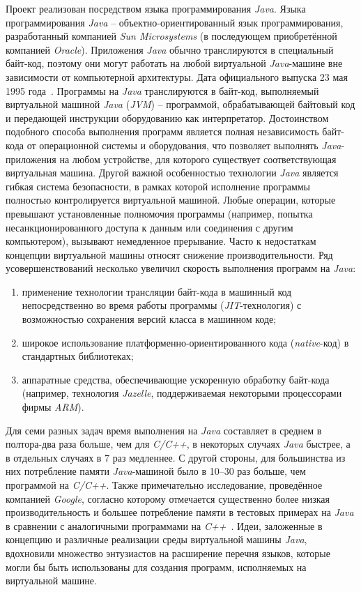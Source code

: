 Проект реализован посредством языка программирования \textit{Java}. Языка программирования \textit{Java} -- объектно-ориентированный язык программирования, разработанный компанией \textit{Sun Microsystems} (в последующем приобретённой компанией \textit{Oracle}). Приложения \textit{Java} обычно транслируются в специальный байт-код, поэтому они могут работать на любой виртуальной \textit{Java}-машине вне зависимости от компьютерной архитектуры. Дата официального выпуска 23 мая 1995 года~\cite{java}.
Программы на \textit{Java} транслируются в байт-код, выполняемый виртуальной машиной \textit{Java} (\textit{JVM}) – программой, обрабатывающей байтовый код и передающей инструкции оборудованию как интерпретатор.
Достоинством подобного способа выполнения программ является полная независимость байт-кода от операционной системы и оборудования, что позволяет выполнять \textit{Java}-приложения на любом устройстве, для которого существует соответствующая виртуальная машина. Другой важной особенностью технологии \textit{Java} является гибкая система безопасности, в рамках которой исполнение программы полностью контролируется виртуальной машиной. Любые операции, которые превышают установленные полномочия программы (например, попытка несанкционированного доступа к данным или соединения с другим компьютером), вызывают немедленное прерывание.
Часто к недостаткам концепции виртуальной машины относят снижение производительности. Ряд усовершенствований несколько увеличил скорость выполнения программ на \textit{Java}:

\begin{enumerate}
	\item применение технологии трансляции байт-кода в машинный код непосредственно во время работы программы (\textit{JIT}-технология) с возможностью сохранения версий класса в машинном коде;
	\item широкое использование платформенно-ориентированного кода (\textit{native}-код) в стандартных библиотеках;
	\item аппаратные средства, обеспечивающие ускоренную обработку байт-кода (например, технология \textit{Jazelle}, поддерживаемая некоторыми процессорами фирмы \textit{ARM}).
\end{enumerate}

Для семи разных задач время выполнения на \textit{Java} составляет в среднем в полтора-два раза больше, чем для \textit{C/C++}, в некоторых случаях \textit{Java} быстрее, а в отдельных случаях в 7 раз медленнее. С другой стороны, для большинства из них потребление памяти \textit{Java}-машиной было в 10–30 раз больше, чем программой на \textit{C/C++}. Также примечательно исследование, проведённое компанией \textit{Google}, согласно которому отмечается существенно более низкая производительность и большее потребление памяти в тестовых примерах на \textit{Java} в сравнении с аналогичными программами на \textit{C++}~\cite{java}.
Идеи, заложенные в концепцию и различные реализации среды виртуальной машины \textit{Java}, вдохновили множество энтузиастов на расширение перечня языков, которые могли бы быть использованы для создания программ, исполняемых на виртуальной машине.

